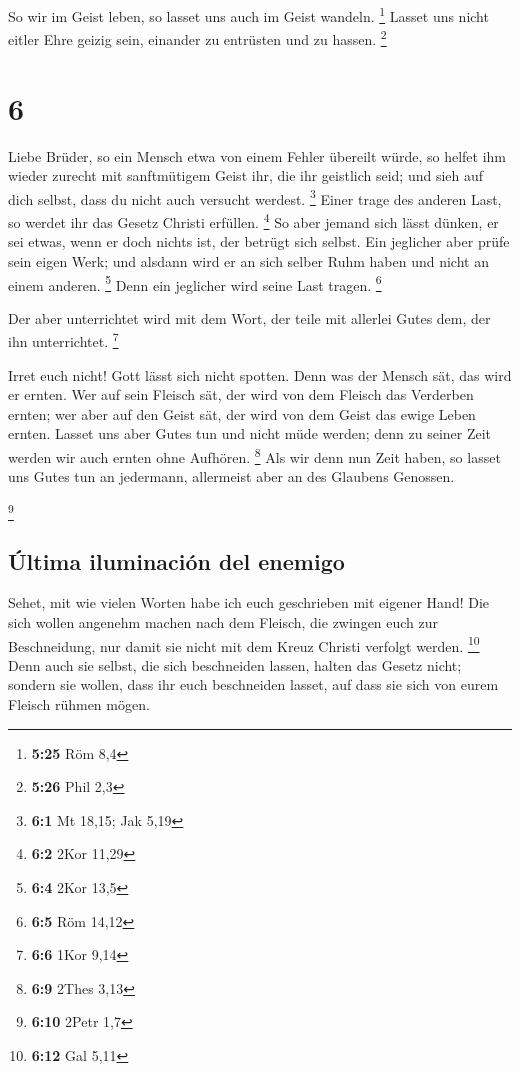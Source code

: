  So wir im Geist leben, so lasset uns auch im Geist
wandeln. \footnote{\textbf{5:25} Röm 8,4}  Lasset uns
nicht eitler Ehre geizig sein, einander zu entrüsten und zu hassen.
\footnote{\textbf{5:26} Phil 2,3}

\hypertarget{section-5}{%
\section{6}\label{section-5}}

 Liebe Brüder, so ein Mensch etwa von einem Fehler
übereilt würde, so helfet ihm wieder zurecht mit sanftmütigem Geist ihr,
die ihr geistlich seid; und sieh auf dich selbst, dass du nicht auch
versucht werdest. \footnote{\textbf{6:1} Mt 18,15; Jak 5,19}
 Einer trage des anderen Last, so werdet ihr das Gesetz
Christi erfüllen. \footnote{\textbf{6:2} 2Kor 11,29}  So
aber jemand sich lässt dünken, er sei etwas, wenn er doch nichts ist,
der betrügt sich selbst.  Ein jeglicher aber prüfe sein
eigen Werk; und alsdann wird er an sich selber Ruhm haben und nicht an
einem anderen. \footnote{\textbf{6:4} 2Kor 13,5}  Denn ein
jeglicher wird seine Last tragen. \footnote{\textbf{6:5} Röm 14,12}

 Der aber unterrichtet wird mit dem Wort, der teile mit
allerlei Gutes dem, der ihn unterrichtet. \footnote{\textbf{6:6} 1Kor
  9,14}

 Irret euch nicht! Gott lässt sich nicht spotten. Denn was
der Mensch sät, das wird er ernten.  Wer auf sein Fleisch
sät, der wird von dem Fleisch das Verderben ernten; wer aber auf den
Geist sät, der wird von dem Geist das ewige Leben ernten. 
Lasset uns aber Gutes tun und nicht müde werden; denn zu seiner Zeit
werden wir auch ernten ohne Aufhören. \footnote{\textbf{6:9} 2Thes 3,13}
 Als wir denn nun Zeit haben, so lasset uns Gutes tun an
jedermann, allermeist aber an des Glaubens Genossen.

\footnote{\textbf{6:10} 2Petr 1,7}

\hypertarget{uxfaltima-iluminaciuxf3n-del-enemigo}{%
\subsection{Última iluminación del
enemigo}\label{uxfaltima-iluminaciuxf3n-del-enemigo}}

 Sehet, mit wie vielen Worten habe ich euch geschrieben
mit eigener Hand!  Die sich wollen angenehm machen nach
dem Fleisch, die zwingen euch zur Beschneidung, nur damit sie nicht mit
dem Kreuz Christi verfolgt werden. \footnote{\textbf{6:12} Gal 5,11}
 Denn auch sie selbst, die sich beschneiden lassen,
halten das Gesetz nicht; sondern sie wollen, dass ihr euch beschneiden
lasset, auf dass sie sich von eurem Fleisch rühmen mögen.

